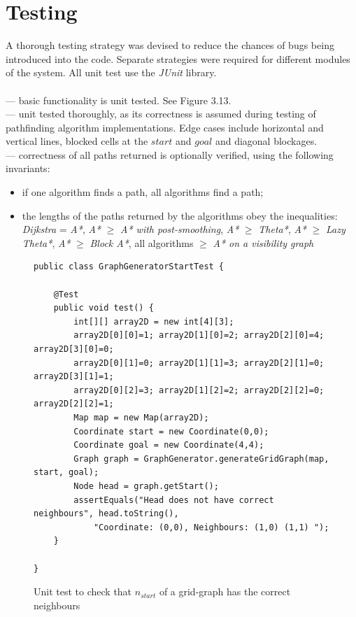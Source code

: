 \documentclass[12pt,notitlepage]{report}
\begin{document}
\section{Testing}

A thorough testing strategy was devised to reduce the chances of bugs being introduced into the code. Separate strategies were required for different modules of the system. All unit test use the {\em JUnit} library.\\

\\

 --- basic functionality is unit tested. See Figure 3.13.\\

 --- unit tested thoroughly, as its correctness is assumed during testing of pathfinding algorithm implementations. Edge cases include horizontal and vertical lines, blocked cells at the $start$ and $goal$ and diagonal blockages.\\

 --- correctness of all paths returned is optionally verified, using the following invariants:
  \begin{itemize}
  \item if one algorithm finds a path, all algorithms find a path;
  \item the lengths of the paths returned by the algorithms obey the inequalities: {\em Dijkstra} = {\em A*}, {\em A*} $\geq$ {\em A* with post-smoothing}, {\em A*} $\geq$ {\em Theta*}, {\em A*} $\geq$ {\em Lazy Theta*}, {\em A*} $\geq$ {\em Block A*}, all algorithms $\geq$ {\em A* on a visibility graph}
  \end{itemize}  
  
  \begin{figure}
\begin{lstlisting}
public class GraphGeneratorStartTest {

	@Test
	public void test() {
		int[][] array2D = new int[4][3];
		array2D[0][0]=1; array2D[1][0]=2; array2D[2][0]=4; array2D[3][0]=0;
		array2D[0][1]=0; array2D[1][1]=3; array2D[2][1]=0; array2D[3][1]=1;
		array2D[0][2]=3; array2D[1][2]=2; array2D[2][2]=0; array2D[2][2]=1;
		Map map = new Map(array2D);
		Coordinate start = new Coordinate(0,0);
		Coordinate goal = new Coordinate(4,4);
		Graph graph = GraphGenerator.generateGridGraph(map, start, goal);
		Node head = graph.getStart();
		assertEquals("Head does not have correct neighbours", head.toString(), 
			"Coordinate: (0,0), Neighbours: (1,0) (1,1) ");
	}

}
\end{lstlisting}
\caption{Unit test to check that $n_{start}$ of a grid-graph has the correct neighbours}
\end{figure}
  
\end{document}
